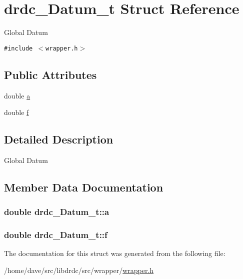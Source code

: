 \hypertarget{structdrdc__Datum__t}{
\section{drdc\_\-Datum\_\-t Struct Reference}
\label{structdrdc__Datum__t}
}
Global Datum  


{\tt \#include $<$wrapper.h$>$}

\subsection*{Public Attributes}
\begin{CompactItemize}
\item 
double \hyperlink{structdrdc__Datum__t_50f29979ad8230245583721b9a6f59df}{a}
\item 
double \hyperlink{structdrdc__Datum__t_97496e0253afc9d6c689241edab36bc7}{f}
\end{CompactItemize}


\subsection{Detailed Description}
Global Datum 



\subsection{Member Data Documentation}
\hypertarget{structdrdc__Datum__t_50f29979ad8230245583721b9a6f59df}{
\subsubsection[a]{\setlength{\rightskip}{0pt plus 5cm}double {\bf drdc\_\-Datum\_\-t::a}}}
\label{structdrdc__Datum__t_50f29979ad8230245583721b9a6f59df}


\hypertarget{structdrdc__Datum__t_97496e0253afc9d6c689241edab36bc7}{
\subsubsection[f]{\setlength{\rightskip}{0pt plus 5cm}double {\bf drdc\_\-Datum\_\-t::f}}}
\label{structdrdc__Datum__t_97496e0253afc9d6c689241edab36bc7}




The documentation for this struct was generated from the following file:\begin{CompactItemize}
\item 
/home/dave/src/libdrdc/src/wrapper/\hyperlink{wrapper_8h}{wrapper.h}\end{CompactItemize}
